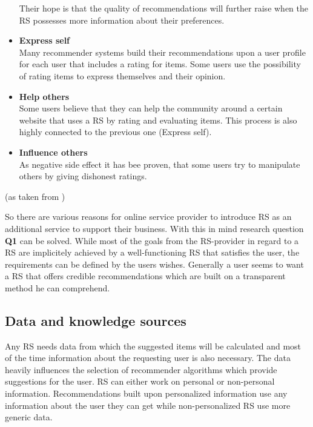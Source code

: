 \begin{itemize}
        Their hope is that the quality of recommendations will further raise when the RS possesses more information about their preferences.
    \item\textbf{Express self}\hfill\\
        Many recommender systems build their recommendations upon a user profile for each user that includes a rating for items.
        Some users use the possibility of rating items to express themselves and their opinion.
    \item\textbf{Help others}\hfill\\
        Some users believe that they can help the community around a certain website that uses a RS by rating and evaluating items.
        This process is also highly connected to the previous one (Express self).
    \item\textbf{Influence others}\hfill\\
        As negative side effect it has bee proven, that some users try to manipulate others by giving dishonest ratings.
\end{itemize}
(as taken from \citep[p.~13-17]{herlocker:2004})

So there are various reasons for online service provider to introduce RS as an additional service to support their business.
With this in mind research question \textbf{Q1} can be solved.
While most of the goals from the RS-provider in regard to a RS are implicitely achieved by a well-functioning RS that satisfies the user, the requirements can be defined by the users wishes.
Generally a user seems to want a RS that offers credible recommendations which are built on a transparent method he can comprehend.





\subsection{Data and knowledge sources}
\label{sec:data-knowledge-source}
Any RS needs data from which the suggested items will be calculated and most of the time information about the requesting user is also necessary.
The data heavily influences the selection of recommender algorithms which provide suggestions for the user.
\citep[p.~7-8]{ricci:2011}
RS can either work on personal or non-personal information.
Recommendations built upon personalized information use any information about the user they can get while non-personalized RS use more generic data.

